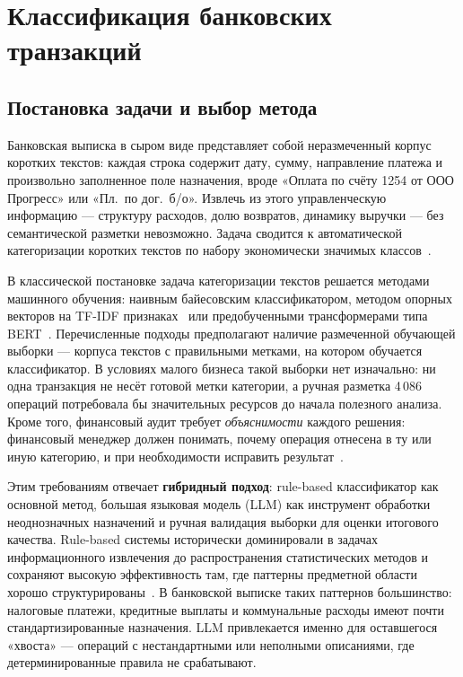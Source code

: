 \chapter{Классификация банковских транзакций}
\label{ch:classification}

\section{Постановка задачи и выбор метода}

Банковская выписка в сыром виде представляет собой неразмеченный корпус коротких текстов: каждая строка содержит дату, сумму, направление платежа и произвольно заполненное поле назначения, вроде «Оплата по счёту 1254 от ООО Прогресс» или «Пл.\ по дог.\ б/о». Извлечь из этого управленческую информацию --- структуру расходов, долю возвратов, динамику выручки --- без семантической разметки невозможно. Задача сводится к автоматической категоризации коротких текстов по набору экономически значимых классов~\cite{aggarwal2012survey}.

В классической постановке задача категоризации текстов решается методами машинного обучения: наивным байесовским классификатором, методом опорных векторов на TF-IDF признаках~\cite{sebastiani2002machine} или предобученными трансформерами типа BERT~\cite{devlin2018bert}. Перечисленные подходы предполагают наличие размеченной обучающей выборки --- корпуса текстов с правильными метками, на котором обучается классификатор. В условиях малого бизнеса такой выборки нет изначально: ни одна транзакция не несёт готовой метки категории, а ручная разметка 4\,086 операций потребовала бы значительных ресурсов до начала полезного анализа. Кроме того, финансовый аудит требует \textit{объяснимости} каждого решения: финансовый менеджер должен понимать, почему операция отнесена в ту или иную категорию, и при необходимости исправить результат~\cite{whittington2012principles}.

Этим требованиям отвечает \textbf{гибридный подход}: rule-based классификатор как основной метод, большая языковая модель (LLM) как инструмент обработки неоднозначных назначений и ручная валидация выборки для оценки итогового качества. Rule-based системы исторически доминировали в задачах информационного извлечения до распространения статистических методов и сохраняют высокую эффективность там, где паттерны предметной области хорошо структурированы~\cite{Cohen1995}. В банковской выписке таких паттернов большинство: налоговые платежи, кредитные выплаты и коммунальные расходы имеют почти стандартизированные назначения. LLM привлекается именно для оставшегося «хвоста» --- операций с нестандартными или неполными описаниями, где детерминированные правила не срабатывают.

